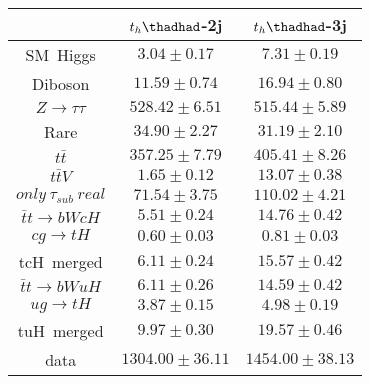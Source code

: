 \centering
\begin{tabular}{ccc} \toprule\toprule
 & $t_{h}\thadhad$-2j & $t_{h}\thadhad$-3j\\\midrule
\hspace{9mm} SM~Higgs & $3.04\pm0.17$ & $7.31\pm0.19$\\
\hspace{9mm} Diboson & $11.59\pm0.74$ & $16.94\pm0.80$\\
\hspace{9mm} $Z\to\tau\tau$ & $528.42\pm6.51$ & $515.44\pm5.89$\\
\hspace{9mm} Rare & $34.90\pm2.27$ & $31.19\pm2.10$\\
\hspace{9mm} $t\bar{t}$ & $357.25\pm7.79$ & $405.41\pm8.26$\\
\hspace{9mm} $t\bar{t}V$ & $1.65\pm0.12$ & $13.07\pm0.38$\\
\hspace{9mm} $only~\tau_{sub}~real$ & $71.54\pm3.75$ & $110.02\pm4.21$\\\midrule

\hspace{9mm}$\bar{t}t\to bWcH$ & $5.51\pm0.24$ & $14.76\pm0.42$\\
\hspace{9mm}$cg\to tH$ & $0.60\pm0.03$ & $0.81\pm0.03$\\
tcH~merged & $6.11\pm0.24$ & $15.57\pm0.42$\\
\hspace{9mm}$\bar{t}t\to bWuH$ & $6.11\pm0.26$ & $14.59\pm0.42$\\
\hspace{9mm}$ug\to tH$ & $3.87\pm0.15$ & $4.98\pm0.19$\\
tuH~merged & $9.97\pm0.30$ & $19.57\pm0.46$\\\midrule

data & $1304.00\pm36.11$ & $1454.00\pm38.13$\\
\bottomrule\bottomrule
\end{tabular}